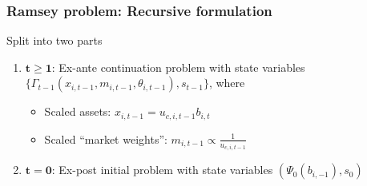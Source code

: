 \documentclass{beamer}
\begin{document}
\begin{frame}

\frametitle{Ramsey problem: Recursive formulation}
\label{extra-slides}
Split  into two parts

\begin{enumerate}
\vspace{3mm}
\item $\mathbf{t\geq1}$: Ex-ante continuation problem with state variables $\{\Gamma_{t-1}(x_{i,t-1},m_{i,t-1},\theta_{i,t-1}),s_{t-1}\}$, where

\begin{itemize}
 \item Scaled assets: $x_{i,t-1}=u_{c,i,t-1}b_{i,t}$
 \item Scaled ``market weights'': $m_{i,t-1}\propto \frac{1}{u_{c,i,t-1}}$
\end{itemize}

% 
\vspace{3mm}
\item $\mathbf{t=0} $: Ex-post initial problem with state variables $(\Psi_0(b_{i,-1}),s_{0})$
\end{enumerate}

\end{frame}
\end{document}
